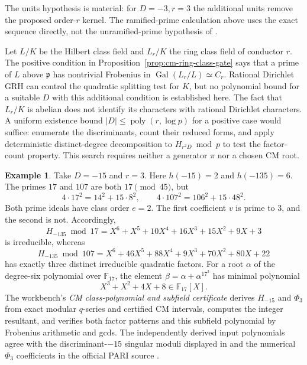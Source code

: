 \documentclass[11pt]{article}
\theoremstyle{definition}
\newtheorem{example}[theorem]{Example}
\theoremstyle{remark}
\begin{document}
The units hypothesis is material: for $D=-3,r=3$ the additional
units remove the proposed order-$r$ kernel.
The ramified-prime calculation above uses the exact sequence
directly, not the unramified-prime hypothesis of
\cite[Lemma~3.1]{BrokerLauterSutherland2012}.

Let $L/K$ be the Hilbert class field and $L_r/K$ the ring class
field of conductor $r$.
The positive condition in Proposition~\ref{prop:cm-ring-class-gate}
says that a prime of $L$ above $\mathfrak p$ has nontrivial
Frobenius in $\operatorname{Gal}(L_r/L)\simeq C_r$.
Rational Dirichlet GRH can control the quadratic splitting test for
$K$, but no polynomial bound for a suitable $D$ with this additional
condition is established here.
The fact that $L_r/K$ is abelian does not identify its characters
with rational Dirichlet characters.
A uniform existence bound $|D|\le\operatorname{poly}(r,\log p)$
for a positive case would suffice: enumerate the discriminants,
count their reduced forms, and apply deterministic distinct-degree
decomposition to $H_{r^2D}\bmod p$ to test the factor-count property.
This search requires neither a generator $\pi$ nor a chosen CM root.

\begin{example}\label{ex:cm-15-135}
Take $D=-15$ and $r=3$.  Here $h(-15)=2$ and $h(-135)=6$.
The primes $17$ and $107$ are both $17\pmod{45}$, but
\[
 4\cdot17^2=14^2+15\cdot8^2,
 \qquad
 4\cdot107^2=106^2+15\cdot48^2.
\]
Both prime ideals have class order $e=2$.
The first coefficient $v$ is prime to $3$, and the second is not.
Accordingly,
\[
 H_{-135}\bmod17
 =X^6+X^5+10X^4+16X^3+15X^2+9X+3
\]
is irreducible, whereas
\[
 H_{-135}\bmod107
 =X^6+46X^5+88X^4+9X^3+70X^2+80X+22
\]
has exactly three distinct irreducible quadratic factors.
For a root $\alpha$ of the degree-six polynomial over $\mathbb F_{17}$,
the element $\beta=\alpha+\alpha^{17^3}$ has minimal polynomial
\[
 X^3+X^2+4X+8\in\mathbb F_{17}[X].
\]
The workbench's \emph{CM class-polynomial and subfield certificate}
derives $H_{-15}$ and $\Phi_3$ from exact modular $q$-series and
certified CM intervals, computes the integer resultant, and verifies
both factor patterns and this subfield polynomial by Frobenius
arithmetic and gcds.
The independently derived input polynomials agree with the
discriminant-$-15$ singular moduli displayed in
\cite[p.~1 of the author manuscript]{Duke2006} and the numerical
$\Phi_3$ coefficients in the official PARI source
\cite{PARIPhi32026}.
\end{example}
\end{document}

